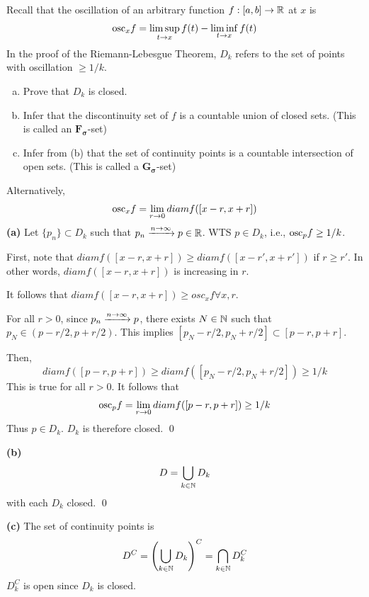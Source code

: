 \documentclass[a4paper, 12pt]{article}
\begin{document}
\begin{problem} [3.19]
Recall that the oscillation of an arbitrary function $f: [a, b] \to \mathbb{R}$ at $x$ is \[
    \mathrm{osc}_x f = \limsup_{t \to x}f(t) - \liminf_{t \to x} f(t)
\]
In the proof of the Riemann-Lebesgue Theorem, $D_k$ refers to the set of points with oscillation $\geq 1/k$.
\begin{enumerate} [(a)]
    \item Prove that $D_k$ is closed.
    \item Infer that the discontinuity set of $f$ is a countable union of closed sets. (This is called an $\mathbf{F_\sigma}$-set)
    \item Infer from (b) that the set of continuity points is a countable intersection of open sets. (This is called a $\mathbf{G_\sigma}$-set)
\end{enumerate}
\end{problem}
\begin{solution}
    Alternatively, \[
        \mathrm{osc}_x f = \lim_{r \to 0} diam f([x-r, x+r])
    \]
    \textbf{(a)} Let $\{p_n\} \subset D_k$ such that $p_n \xrightarrow{n \to \infty} p \in \mathbb{R}$. WTS $p \in D_k$, i.e., $ \mathrm{osc}_p f \geq 1/k$.

    First, note that $diam f([x-r, x+r]) \geq diam f([x-r', x+r'])$ if $r \geq r'$. In other words, $diam f([x-r, x+r])$ is increasing in $r$.

    It follows that $diam f([x-r, x+r]) \geq osc_xf \forall x, r$.

    For all $r > 0$, since $p_n \xrightarrow{n \to \infty} p$, there exists $N \in \mathbb{N}$ such that $p_N \in (p-r/2, p+r/2)$. This implies $[p_N -r/2, p_N + r/2] \subset [p-r, p+r]$.

    Then, \[
        diam f([p-r, p+r]) \geq diam f([p_N - r/2, p_N + r/2]) \geq 1/k
    \]
    This is true for all $r> 0$. It follows that \[
    \mathrm{osc}_p f = \lim_{r \to 0} diam f([p-r, p+r]) \geq 1/k
    \]
    Thus $p \in D_k$. $D_k$ is therefore closed. \qed

    \textbf{(b)}
    \[
        D = \bigcup_{k \in \mathbb{N}}D_k
    \]
    with each $D_k$ closed. \qed

    \textbf{(c)} The set of continuity points is \[
        D^C = \left(\bigcup_{k \in \mathbb{N}}D_k\right)^C = \bigcap_{k \in \mathbb{N}}D_k^C
    \]
    $D_k^C$ is open since $D_k$ is closed.
\end{solution}
\end{document}
